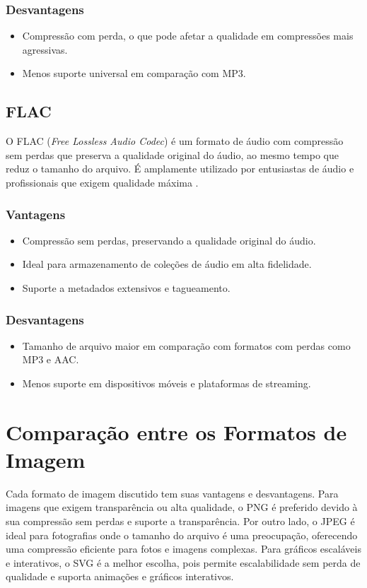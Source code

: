 \documentclass[12pt]{report}
\begin{document}
	\subsubsection{Desvantagens}
	\begin{itemize}
		\item Compressão com perda, o que pode afetar a qualidade em compressões mais agressivas.
		\item Menos suporte universal em comparação com MP3.
	\end{itemize}
	
	\subsection{FLAC}
	O FLAC (\textit{Free Lossless Audio Codec}) é um formato de áudio com compressão sem perdas que preserva a qualidade original do áudio, ao mesmo tempo que reduz o tamanho do arquivo. É amplamente utilizado por entusiastas de áudio e profissionais que exigem qualidade máxima \cite{aero2024}.
	
	\subsubsection{Vantagens}
	\begin{itemize}
		\item Compressão sem perdas, preservando a qualidade original do áudio.
		\item Ideal para armazenamento de coleções de áudio em alta fidelidade.
		\item Suporte a metadados extensivos e tagueamento.
	\end{itemize}
	
	\subsubsection{Desvantagens}
	\begin{itemize}
		\item Tamanho de arquivo maior em comparação com formatos com perdas como MP3 e AAC.
		\item Menos suporte em dispositivos móveis e plataformas de streaming.
	\end{itemize}

	\section{Comparação entre os Formatos de Imagem}
	Cada formato de imagem discutido tem suas vantagens e desvantagens. Para imagens que exigem transparência ou alta qualidade, o PNG é preferido devido à sua compressão sem perdas e suporte a transparência. Por outro lado, o JPEG é ideal para fotografias onde o tamanho do arquivo é uma preocupação, oferecendo uma compressão eficiente para fotos e imagens complexas. Para gráficos escaláveis e interativos, o SVG é a melhor escolha, pois permite escalabilidade sem perda de qualidade e suporta animações e gráficos interativos.
	
\end{document}
